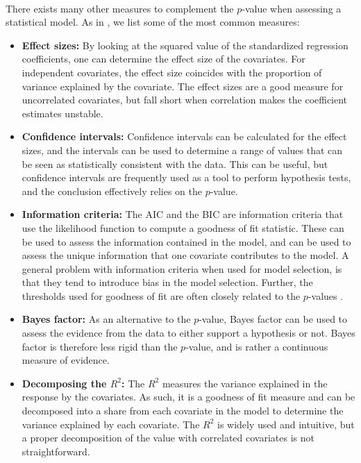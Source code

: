 \\
There exists many other measures to complement the $p$-value when assessing a statistical model. As in \citet{Arnstad:Relative_variable_importance_in_Bayesian_linear_mixed_models:2024}, we list some of the most common measures:
\begin{itemize}
    \item \textbf{Effect sizes:} By looking at the squared value of the standardized regression coefficients, one can determine the effect size of the covariates. For independent covariates, the effect size coincides with the proportion of variance explained by the covariate. The effect sizes are a good measure for uncorrelated covariates, but fall short when correlation makes the coefficient estimates unstable.
    \item \textbf{Confidence intervals:} Confidence intervals can be calculated for the effect sizes, and the intervals can be used to determine a range of values that can be seen as statistically consistent with the data. This can be useful, but confidence intervals are frequently used as a tool to perform hypothesis tests, and the conclusion effectively relies on the $p$-value.
    \item \textbf{Information criteria:} The AIC \citep{Akaike_AIC} and the BIC \citep{Schwarz_BIC} are information criteria that use the likelihood function to compute a goodness of fit statistic. These can be used to assess the information contained in the model, and can be used to assess the unique information that one covariate contributes to the model. A general problem with information criteria when used for model selection, is that they tend to introduce bias in the model selection. Further, the thresholds used for goodness of fit are often closely related to the $p$-values \citep{Murtaugh2014}. 
    \item \textbf{Bayes factor:} As an alternative to the $p$-value, Bayes factor can be used to assess the evidence from the data to either support a hypothesis or not. Bayes factor is therefore less rigid than the $p$-value, and is rather a continuous measure of evidence.
    \item \textbf{Decomposing the $R^2$:} The $R^2$ measures the variance explained in the response by the covariates. As such, it is a goodness of fit measure and can be decomposed into a share from each covariate in the model to determine the variance explained by each covariate. The $R^2$ is widely used and intuitive, but a proper decomposition of the value with correlated covariates is not straightforward.
\end{itemize}
